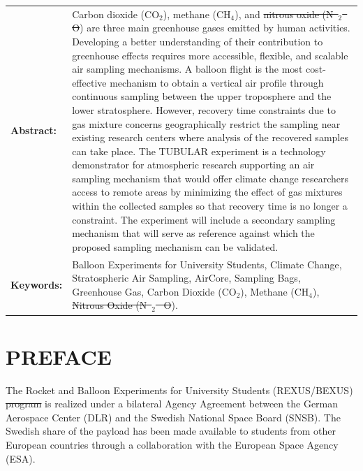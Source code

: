 \documentclass[a4paper,12pt,twoside, final]{article}
\providecommand{\DIFaddtex}[1]{{\protect\color{blue}\uwave{#1}}} %
\providecommand{\DIFdeltex}[1]{{\protect\color{red}\sout{#1}}}                      %
\providecommand{\DIFaddbegin}{} %
\providecommand{\DIFaddend}{} %
\providecommand{\DIFdelbegin}{} %
\providecommand{\DIFdelend}{} %
\providecommand{\DIFadd}[1]{\texorpdfstring{\DIFaddtex{#1}}{#1}} %
\providecommand{\DIFdel}[1]{\texorpdfstring{\DIFdeltex{#1}}{}} %
\newcommand{\DIFscaledelfig}{0.5}
\newlength{\DIFdelgraphicswidth} %
\newlength{\DIFdelgraphicsheight} %
\newcommand{\DIFaddincludegraphics}[2][]{{\color{blue}\fbox{\DIFOincludegraphics[#1]{#2}}}} %
\newcommand{\DIFdelincludegraphics}[2][]{%
\sbox{\DIFdelgraphicsbox}{\DIFOincludegraphics[#1]{#2}}%
\settoboxwidth{\DIFdelgraphicswidth}{\DIFdelgraphicsbox} %
\settoboxtotalheight{\DIFdelgraphicsheight}{\DIFdelgraphicsbox} %
\scalebox{\DIFscaledelfig}{%
\parbox[b]{\DIFdelgraphicswidth}{\usebox{\DIFdelgraphicsbox}\\[-\baselineskip] \rule{\DIFdelgraphicswidth}{0em}}\llap{\resizebox{\DIFdelgraphicswidth}{\DIFdelgraphicsheight}{%
\setlength{\unitlength}{\DIFdelgraphicswidth}%
\begin{picture}(1,1)%
\thicklines\linethickness{2pt} %
{\color[rgb]{1,0,0}\put(0,0){\framebox(1,1){}}}%
{\color[rgb]{1,0,0}\put(0,0){\line( 1,1){1}}}%
{\color[rgb]{1,0,0}\put(0,1){\line(1,-1){1}}}%
\end{picture}%
}\hspace*{3pt}}} %
} %
\DeclareRobustCommand{\DIFaddbegin}{\DIFOaddbegin \let\includegraphics\DIFaddincludegraphics} %
\DeclareRobustCommand{\DIFaddend}{\DIFOaddend \let\includegraphics\DIFOincludegraphics} %
\DeclareRobustCommand{\DIFdelbegin}{\DIFOdelbegin \let\includegraphics\DIFdelincludegraphics} %
\DeclareRobustCommand{\DIFdelend}{\DIFOaddend \let\includegraphics\DIFOincludegraphics} %
\begin{document}
\vspace{1cm}
\begin{tabular}{p{} p{}}
\textbf{Abstract:}     &  %
Carbon dioxide (CO$_{2}$), methane (CH$_{4}$), and \DIFdelbegin \DIFdel{nitrous oxide (N\mbox{%
$_2$
}%
O}\DIFdelend \DIFaddbegin \DIFadd{carbon monoxide (CO}\DIFaddend ) are three main greenhouse gases emitted by human activities. Developing a better understanding of their contribution to greenhouse effects requires more accessible, flexible, and scalable air sampling mechanisms. A balloon flight is the most cost-effective mechanism to obtain a vertical air profile through continuous sampling between the upper troposphere and the lower stratosphere. However, recovery time constraints due to gas mixture concerns geographically restrict the sampling near existing research centers where analysis of the recovered samples can take place. The TUBULAR experiment is a technology demonstrator for atmospheric research supporting an air sampling mechanism that would offer climate change researchers access to remote areas by minimizing the effect of gas mixtures within the collected samples so that recovery time is no longer a constraint. The experiment will include a secondary sampling mechanism that will serve as reference against which the proposed sampling mechanism can be validated.  &  \\
\textbf{Keywords:}     & %
Balloon Experiments for University Students, Climate Change, Stratospheric Air Sampling, AirCore, Sampling Bags, Greenhouse Gas, Carbon Dioxide (CO$_{2}$), Methane (CH$_{4}$), \DIFdelbegin \DIFdel{Nitrous Oxide (N\mbox{%
$_{2}$
}%
O}\DIFdelend \DIFaddbegin \DIFadd{Carbon Monoxide (CO}\DIFaddend ).
\end{tabular}

\vfill

\newpage
\tableofcontents

\newpage
\section*{PREFACE} \markboth{}{}

The Rocket and Balloon Experiments for University Students (REXUS/BEXUS) \DIFdelbegin \DIFdel{program }\DIFdelend \DIFaddbegin \DIFadd{programme }\DIFaddend is realized under a bilateral Agency Agreement between the German Aerospace Center (DLR) and the Swedish National Space Board (SNSB). The Swedish share of the
payload has been made available to students from other European countries through a collaboration with the European Space Agency (ESA).
\end{document}
